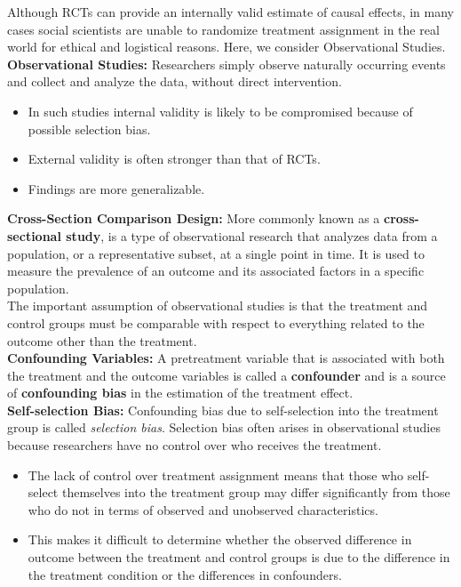 \documentclass{article}
\begin{document}
    \noindent Although RCTs can provide an internally valid estimate of
causal effects, in many cases social scientists are unable to randomize
treatment assignment in the real world for ethical and logistical reasons.
Here, we consider Observational Studies.\\

    \noindent \textbf{Observational Studies:} Researchers simply observe
naturally occurring events and collect and analyze the data, without direct
intervention.
    \begin{itemize}
        \item In such studies internal validity is likely to be compromised
        because of possible selection bias.
        \item External validity is often stronger than that of RCTs.
        \item Findings are more generalizable.
    \end{itemize}

    \noindent \textbf{Cross-Section Comparison Design:} More commonly known
as a \textbf{cross-sectional study}, is a type of observational research
that analyzes data from a population, or a representative subset, at a
single point in time. It is used to measure the prevalence of an outcome and
its associated factors in a specific population.\\

    \noindent The important assumption of observational studies is that the
treatment and control groups must be comparable with respect to everything
related to the outcome other than the treatment.\\

    \noindent \textbf{Confounding Variables:} A pretreatment variable that
is associated with both the treatment and the outcome variables is called a \textbf{confounder} and is a source of \textbf{confounding bias} in the estimation of the treatment effect.\\

    \noindent \textbf{Self-selection Bias:} Confounding bias due to
self-selection into the treatment group is called \textit{selection bias}.
Selection bias often arises in observational studies because researchers
have no control over who receives the treatment.
    \begin{itemize}
        \item The lack of control over treatment assignment means that those
        who self-select themselves into the treatment group may differ
        significantly from those who do not in terms of observed and
        unobserved characteristics.
        \item This makes it difficult to determine whether the observed
        difference in outcome between the treatment and control groups is
        due to the difference in the treatment condition or the differences
        in confounders.
    \end{itemize}
\end{document}
